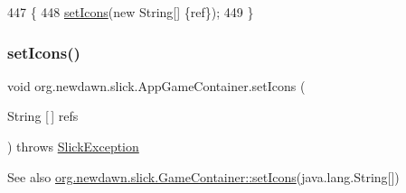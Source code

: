 \begin{DoxyCode}
447                                                           \{
448         \mbox{\hyperlink{classorg_1_1newdawn_1_1slick_1_1_app_game_container_a1bb9f7e3e418dc296c420f826302f070}{setIcons}}(\textcolor{keyword}{new} String[] \{ref\});
449     \}
\end{DoxyCode}
\mbox{\label{classorg_1_1newdawn_1_1slick_1_1_app_game_container_a1bb9f7e3e418dc296c420f826302f070}} 
\subsubsection{\texorpdfstring{set\+Icons()}{setIcons()}}
{\footnotesize\ttfamily void org.\+newdawn.\+slick.\+App\+Game\+Container.\+set\+Icons (\begin{DoxyParamCaption}\item[{String \mbox{[}$\,$\mbox{]}}]{refs }\end{DoxyParamCaption}) throws \mbox{\hyperlink{classorg_1_1newdawn_1_1slick_1_1_slick_exception}{Slick\+Exception}}\hspace{0.3cm}{\ttfamily [inline]}}

\begin{DoxySeeAlso}{See also}
\mbox{\hyperlink{classorg_1_1newdawn_1_1slick_1_1_game_container_a9be825e4e0980618340296e9cbbededf}{org.\+newdawn.\+slick.\+Game\+Container\+::set\+Icons}}(java.\+lang.\+String\mbox{[}\mbox{]}) 
\end{DoxySeeAlso}

